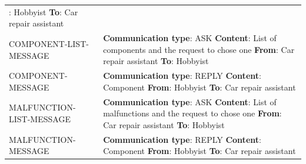 \begin{tabular}{|>{\colleft}p{3cm}|>{\colleft}p{8.5cm}|}
					  {\bf From}: Hobbyist\newline
					  {\bf To}: Car repair assistant\\
COMPONENT-LIST-MESSAGE		& {\bf Communication type}: ASK\newline
					  {\bf Content}: List of components and the request to chose one\newline
					  {\bf From}: Car repair assistant\newline
					  {\bf To}: Hobbyist\\
COMPONENT-MESSAGE			& {\bf Communication type}: REPLY\newline
					  {\bf Content}: Component\newline
					  {\bf From}: Hobbyist\newline
					  {\bf To}: Car repair assistant\\
MALFUNCTION-LIST-MESSAGE	& {\bf Communication type}: ASK\newline
					  {\bf Content}: List of malfunctions and the request to chose one\newline
					  {\bf From}: Car repair assistant\newline
					  {\bf To}: Hobbyist\\
MALFUNCTION-MESSAGE		& {\bf Communication type}: REPLY\newline
					  {\bf Content}: Component\newline
					  {\bf From}: Hobbyist\newline
					  {\bf To}: Car repair assistant\\\hline
\end{tabular}


